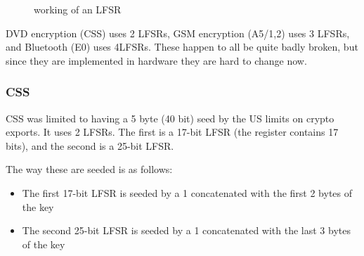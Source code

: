 \documentclass[10pt,a4paper]{report}
\begin{document}
\begin{figure}[H]
    \centering
    \caption{working of an LFSR}
    \label{fig:lsfr}
\end{figure}

DVD encryption (CSS) uses 2 LFSRs, GSM encryption (A5/1,2) uses 3 LFSRs, and Bluetooth (E0) uses
4LFSRs. These happen to all be quite badly broken, but since they are implemented in hardware they
are hard to change now.

\subsubsection*{CSS}

CSS was limited to having a 5 byte (40 bit) seed by the US limits on crypto exports. It uses 2
LFSRs. The first is a 17-bit LFSR (the register contains 17 bits), and the second is a 25-bit LFSR.

The way these are seeded is as follows:

\begin{itemize}
    \item The first 17-bit LFSR is seeded by a 1 concatenated with the first 2 bytes of the key
    \item The second 25-bit LFSR is seeded by a 1 concatenated with the last 3 bytes of the key
\end{itemize}
\end{document}
